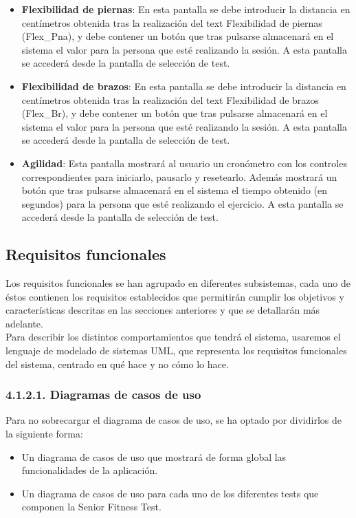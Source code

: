 \begin{itemize}
\item \textbf{Flexibilidad de piernas}: En esta pantalla se debe introducir la distancia en centímetros obtenida tras la realización del text Flexibilidad de piernas (Flex\_Pna), y debe contener un botón que tras pulsarse almacenará en el sistema el valor para la persona que esté realizando la sesión. A esta pantalla se accederá desde la pantalla de selección de test.
\item \textbf{Flexibilidad de brazos}: En esta pantalla se debe introducir la distancia en centímetros obtenida tras la realización del text Flexibilidad de brazos (Flex\_Br), y debe contener un botón que tras pulsarse almacenará en el sistema el valor para la persona que esté realizando la sesión. A esta pantalla se accederá desde la pantalla de selección de test.
\item \textbf{Agilidad}: Esta pantalla mostrará al usuario un cronómetro con los controles correspondientes para iniciarlo, pausarlo y resetearlo. Además mostrará un botón que tras pulsarse almacenará en el sistema el tiempo obtenido (en segundos) para la persona que esté realizando el ejercicio. A esta pantalla se accederá desde la pantalla de selección de test.
\end{itemize}

\subsection{Requisitos funcionales}

Los requisitos funcionales se han agrupado en diferentes subsistemas, cada uno de éstos contienen los requisitos establecidos que permitirán cumplir los objetivos y características descritas en las secciones anteriores y que se detallarán más adelante.\\

Para describir los distintos comportamientos que tendrá el sistema, usaremos el lenguaje de modelado de sistemas UML, que representa los requisitos funcionales del sistema, centrado en qué hace y no cómo lo hace.

\subsubsection{4.1.2.1. Diagramas de casos de uso}

Para no sobrecargar el diagrama de casos de uso, se ha optado por dividirlos de la siguiente forma:
\begin{itemize}
\item Un diagrama de casos de uso que mostrará de forma global las funcionalidades de la aplicación.
\item Un diagrama de casos de uso para cada uno de los diferentes tests que componen la Senior Fitness Test.
\end{itemize}


